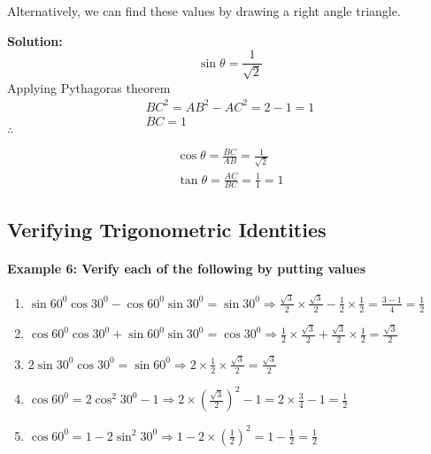 \documentclass{article}
\begin{document}
Alternatively, we can find these values by drawing a right angle triangle.

\begin{center}
\end{center}

{\scriptsize \textbf{Solution:}}
\[ \sin\theta = \frac{1}{\sqrt{2}} \]
Applying Pythagoras theorem
\[
  \begin{aligned}
    BC^{2} = AB^{2} - AC^{2} = 2 - 1 = 1 \\
    BC = 1
  \end{aligned}
\]
$\therefore$

\[
  \begin{aligned}
    \cos\theta = \frac{BC}{AB} = \frac{1}{\sqrt{2}} \\
    \tan\theta = \frac{AC}{BC} = \frac{1}{1} = 1
  \end{aligned}
\]

\subsection{Verifying Trigonometric Identities}
\paragraph{Example 6: Verify each of the following by putting values}

\begin{enumerate}[label=\alph*)]
  \item $\sin 60^{0} \cos 30^{0} - \cos 60^{0} \sin 30^{0} = \sin 30^{0} \Rightarrow \frac{\sqrt{3}}{2} \times \frac{\sqrt{3}}{2} - \frac{1}{2} \times \frac{1}{2} = \frac{3-1}{4}=\frac{1}{2}$
  \item $\cos 60^{0} \cos 30^{0} + \sin 60^{0} \sin 30^{0} = \cos 30^{0} \Rightarrow \frac{1}{2} \times \frac{\sqrt{3}}{2} + \frac{\sqrt{3}}{2} \times \frac{1}{2} = \frac{\sqrt{3}}{2}$
  \item $2 \sin 30^{0} \cos 30^{0} = \sin 60^{0} \Rightarrow 2 \times \frac{1}{2} \times \frac{\sqrt{3}}{2} = \frac{\sqrt{3}}{2}$
  \item $\cos 60^{0} = 2 \cos^{2} 30^{0} - 1 \Rightarrow 2 \times \left(\frac{\sqrt{3}}{2}\right)^{2} - 1 = 2 \times \frac{3}{4} - 1 = \frac{1}{2}$
  \item $\cos 60^{0} = 1 - 2 \sin^{2} 30^{0} \Rightarrow 1 - 2 \times \left(\frac{1}{2}\right)^{2} = 1 - \frac{1}{2} = \frac{1}{2}$
\end{enumerate}
\end{document}
